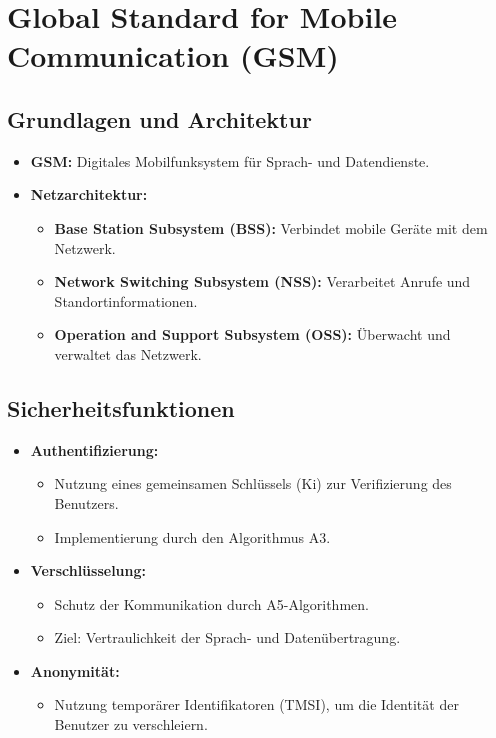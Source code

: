\documentclass{article}
\begin{document}
\section{Global Standard for Mobile Communication (GSM)}

\subsection{Grundlagen und Architektur}
\begin{itemize}
    \item \textbf{GSM:} Digitales Mobilfunksystem für Sprach- und Datendienste.
    \item \textbf{Netzarchitektur:}
    \begin{itemize}
        \item \textbf{Base Station Subsystem (BSS):} Verbindet mobile Geräte mit dem Netzwerk.
        \item \textbf{Network Switching Subsystem (NSS):} Verarbeitet Anrufe und Standortinformationen.
        \item \textbf{Operation and Support Subsystem (OSS):} Überwacht und verwaltet das Netzwerk.
    \end{itemize}
\end{itemize}

\subsection{Sicherheitsfunktionen}
\begin{itemize}
    \item \textbf{Authentifizierung:}
    \begin{itemize}
        \item Nutzung eines gemeinsamen Schlüssels (Ki) zur Verifizierung des Benutzers.
        \item Implementierung durch den Algorithmus A3.
    \end{itemize}
    \item \textbf{Verschlüsselung:}
    \begin{itemize}
        \item Schutz der Kommunikation durch A5-Algorithmen.
        \item Ziel: Vertraulichkeit der Sprach- und Datenübertragung.
    \end{itemize}
    \item \textbf{Anonymität:}
    \begin{itemize}
        \item Nutzung temporärer Identifikatoren (TMSI), um die Identität der Benutzer zu verschleiern.
    \end{itemize}
\end{itemize}
\end{document}
